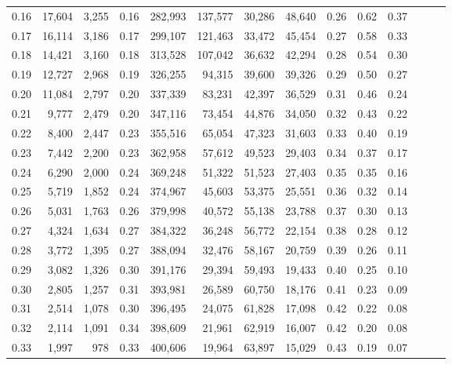 \begin{tabular}{rrrrrrrrrrrrrr}
0.16 &  17,604 &  3,255 &  0.16 &  282,993 &  137,577 &  30,286 &  48,640 &  0.26 &  0.62 &      0.37 \\
0.17 &  16,114 &  3,186 &  0.17 &  299,107 &  121,463 &  33,472 &  45,454 &  0.27 &  0.58 &      0.33 \\
0.18 &  14,421 &  3,160 &  0.18 &  313,528 &  107,042 &  36,632 &  42,294 &  0.28 &  0.54 &      0.30 \\
0.19 &  12,727 &  2,968 &  0.19 &  326,255 &   94,315 &  39,600 &  39,326 &  0.29 &  0.50 &      0.27 \\
0.20 &  11,084 &  2,797 &  0.20 &  337,339 &   83,231 &  42,397 &  36,529 &  0.31 &  0.46 &      0.24 \\
0.21 &   9,777 &  2,479 &  0.20 &  347,116 &   73,454 &  44,876 &  34,050 &  0.32 &  0.43 &      0.22 \\
0.22 &   8,400 &  2,447 &  0.23 &  355,516 &   65,054 &  47,323 &  31,603 &  0.33 &  0.40 &      0.19 \\
0.23 &   7,442 &  2,200 &  0.23 &  362,958 &   57,612 &  49,523 &  29,403 &  0.34 &  0.37 &      0.17 \\
0.24 &   6,290 &  2,000 &  0.24 &  369,248 &   51,322 &  51,523 &  27,403 &  0.35 &  0.35 &      0.16 \\
0.25 &   5,719 &  1,852 &  0.24 &  374,967 &   45,603 &  53,375 &  25,551 &  0.36 &  0.32 &      0.14 \\
0.26 &   5,031 &  1,763 &  0.26 &  379,998 &   40,572 &  55,138 &  23,788 &  0.37 &  0.30 &      0.13 \\
0.27 &   4,324 &  1,634 &  0.27 &  384,322 &   36,248 &  56,772 &  22,154 &  0.38 &  0.28 &      0.12 \\
0.28 &   3,772 &  1,395 &  0.27 &  388,094 &   32,476 &  58,167 &  20,759 &  0.39 &  0.26 &      0.11 \\
0.29 &   3,082 &  1,326 &  0.30 &  391,176 &   29,394 &  59,493 &  19,433 &  0.40 &  0.25 &      0.10 \\
0.30 &   2,805 &  1,257 &  0.31 &  393,981 &   26,589 &  60,750 &  18,176 &  0.41 &  0.23 &      0.09 \\
0.31 &   2,514 &  1,078 &  0.30 &  396,495 &   24,075 &  61,828 &  17,098 &  0.42 &  0.22 &      0.08 \\
0.32 &   2,114 &  1,091 &  0.34 &  398,609 &   21,961 &  62,919 &  16,007 &  0.42 &  0.20 &      0.08 \\
0.33 &   1,997 &    978 &  0.33 &  400,606 &   19,964 &  63,897 &  15,029 &  0.43 &  0.19 &      0.07 \\

\end{tabular}
